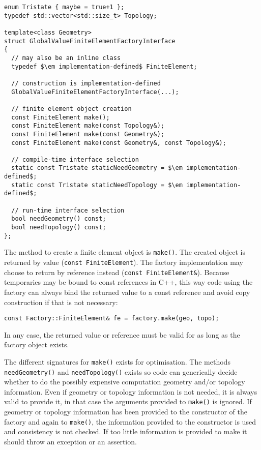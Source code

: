\documentclass[a4paper,11pt]{article}
\begin{document}
\begin{lstlisting}[escapechar=\$]
enum Tristate { maybe = true+1 };
typedef std::vector<std::size_t> Topology;

template<class Geometry>
struct GlobalValueFiniteElementFactoryInterface
{
  // may also be an inline class
  typedef $\em implementation-defined$ FiniteElement;

  // construction is implementation-defined
  GlobalValueFiniteElementFactoryInterface(...);

  // finite element object creation
  const FiniteElement make();
  const FiniteElement make(const Topology&);
  const FiniteElement make(const Geometry&);
  const FiniteElement make(const Geometry&, const Topology&);

  // compile-time interface selection
  static const Tristate staticNeedGeometry = $\em implementation-defined$;
  static const Tristate staticNeedTopology = $\em implementation-defined$;

  // run-time interface selection
  bool needGeometry() const;
  bool needTopology() const;
};
\end{lstlisting}
The method to create a finite element object is {\tt make()}.  The created
object is returned by value ({\tt const FiniteElement}).  The factory
implementation may choose to return by reference instead ({\tt const
  FiniteElement\&}).  Because temporaries may be bound to const references in
C++, this way code using the factory can always bind the returned value to a
const reference and avoid copy construction if that is not necessary:
\begin{lstlisting}
const Factory::FiniteElement& fe = factory.make(geo, topo);
\end{lstlisting}
In any case, the returned value or reference must be valid for as long as the
factory object exists.

The different signatures for {\tt make()} exists for optimisation.  The
methods {\tt need\-Geometry()} and {\tt needTopology()} exists so code can
generically decide whether to do the possibly expensive computation geometry
and/or topology information.  Even if geometry or topology information is not
needed, it is always valid to provide it, in that case the arguments provided
to {\tt make()} is ignored.  If geometry or topology information has been
provided to the constructor of the factory and again to {\tt make()}, the
information provided to the constructor is used and consistency is not
checked.  If too little information is provided to make it should throw an
exception or an assertion.
\end{document}
